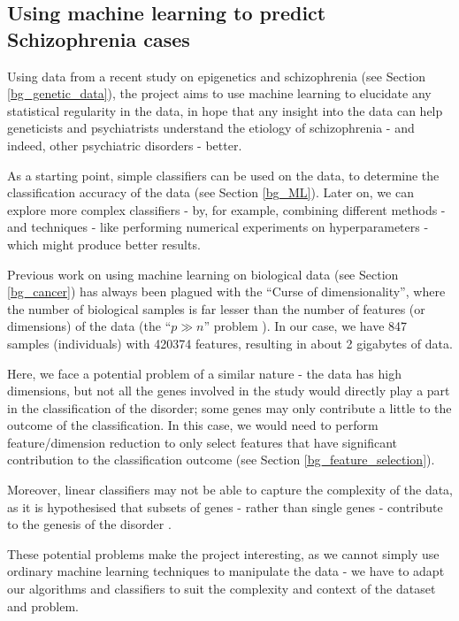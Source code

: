 \documentclass[12pt, twoside, a4paper]{article}
\begin{document}
\subsection{Using machine learning to predict Schizophrenia cases} \label{intro_ML}

Using data from a recent study on epigenetics and schizophrenia (see Section \ref{bg_genetic_data}), the project aims to use machine learning to elucidate any statistical regularity in the data, in hope that any insight into the data can help geneticists and psychiatrists understand the etiology of schizophrenia - and indeed, other psychiatric disorders - better.

As a starting point, simple classifiers can be used on the data, to determine the classification accuracy of the data (see Section \ref{bg_ML}). Later on, we can explore more complex classifiers - by, for example, combining different methods - and techniques - like performing numerical experiments on hyperparameters - which might produce better results.

Previous work on using machine learning on biological data (see Section \ref{bg_cancer}) has always been plagued with the ``Curse of dimensionality'', where the number of biological samples is far lesser than the number of features (or dimensions) of the data (the ``$p \gg n$'' problem \cite{RefWorks:96}). In our case, we have 847 samples (individuals) with 420374 features, resulting in about 2 gigabytes of data.

Here, we face a potential problem of a similar nature - the data has high dimensions, but not all the genes involved in the study would directly play a part in the classification of the disorder; some genes may only contribute a little to the outcome of the classification. In this case, we would need to perform feature/dimension reduction to only select features that have significant contribution to the classification outcome (see Section \ref{bg_feature_selection}).

Moreover, linear classifiers may not be able to capture the complexity of the data, as it is hypothesised that subsets of genes - rather than single genes - contribute to the genesis of the disorder \cite{RefWorks:10}.

These potential problems make the project interesting, as we cannot simply use ordinary machine learning techniques to manipulate the data - we have to adapt our algorithms and classifiers to suit the complexity and context of the dataset and problem.
\end{document}
